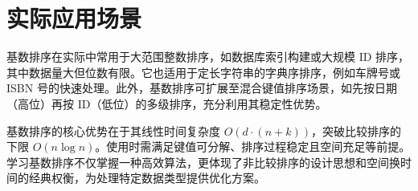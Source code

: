 \chapter{实际应用场景}
基数排序在实际中常用于大范围整数排序，如数据库索引构建或大规模 ID 排序，其中数据量大但位数有限。它也适用于定长字符串的字典序排序，例如车牌号或 ISBN 号的快速处理。此外，基数排序可扩展至混合键值排序场景，如先按日期（高位）再按 ID（低位）的多级排序，充分利用其稳定性优势。\par
基数排序的核心优势在于其线性时间复杂度 $O(d \cdot (n + k))$，突破比较排序的下限 $O(n \log n)$。使用时需满足键值可分解、排序过程稳定且空间充足等前提。学习基数排序不仅掌握一种高效算法，更体现了非比较排序的设计思想和空间换时间的经典权衡，为处理特定数据类型提供优化方案。\par
